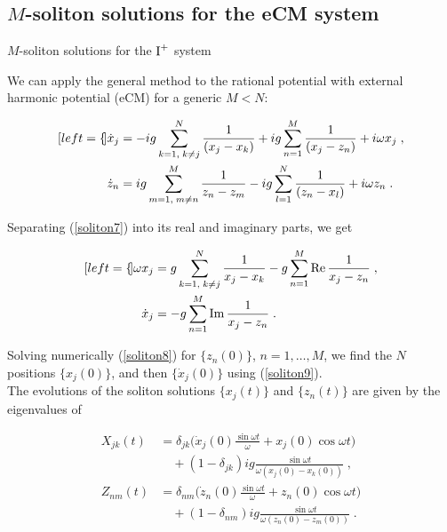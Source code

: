 \documentclass[aspectratio=169, 9pt]{beamer}
\begin{document}
\subsection{$M$-soliton solutions for the eCM system}
\begin{frame}[allowframebreaks]{$M$-soliton solutions for the $\textnormal{I}^+$ system}

We can apply the general method to the rational potential with external harmonic potential (eCM) for a generic $M < N$:

\begin{subequations}
\begin{align}[left=\empheqlbrace]
\dot x_j &= -ig \sum_{k=1,\;k \neq j}^N \frac{1}{(x_j - x_k)} + ig \sum_{n = 1}^M \frac{1}{(x_j - z_n)} + i\omega x_j \label{soliton7}\;,\\
\dot z_n &= ig \sum_{m=1,\;m\neq n}^M \frac{1}{z_n - z_m} - ig \sum_{l=1}^N \frac{1}{(z_n - x_l)} + i\omega z_n\;.
\end{align}
\end{subequations}

Separating (\ref{soliton7}) into its real and imaginary parts, we get

\begin{subequations}
\begin{align}[left=\empheqlbrace]
    \omega x_j &= g\sum_{k=1,\;k \neq j}^N \frac{1}{x_j - x_k} - g \sum_{n=1}^M\operatorname{Re}{\frac{1}{x_j - z_n}} \label{soliton8}\;, \\
    \dot x_j &= - g \sum_{n=1}^M\operatorname{Im}{\frac{1}{x_j - z_n}} \label{soliton9}\;.
\end{align}
\end{subequations}

Solving numerically (\ref{soliton8}) for $\{z_n(0)\}$, $n = 1, \dots, M$, we find the $N$ positions $\{x_j(0)\}$, and then $\{\dot x_j(0)\}$ using (\ref{soliton9}). \\
The evolutions of the soliton solutions $\{x_j(t)\}$ and $\{z_n(t)\}$ are given by the eigenvalues of

\begin{subequations}
\begin{align}
    X_{jk} (t) &= \delta_{jk} \Big (\dot x_j(0)\frac{\sin{\omega t}}{\omega} + x_j (0)\cos{\omega t} \Big ) \nonumber\\ &\quad + (1 - \delta_{jk}) ig \frac{\sin{\omega t}}{\omega(x_j(0) - x_k(0))}\;, \\
    Z_{nm} (t) &= \delta_{nm} \Big (\dot z_n(0)\frac{\sin{\omega t}}{\omega} + z_n (0)\cos{\omega t} \Big ) \nonumber\\ &\quad + (1 - \delta_{nm}) ig \frac{\sin{\omega t}}{\omega(z_n(0) - z_m(0))}\;.
\end{align}
\end{subequations}


\end{frame}
\end{document}
